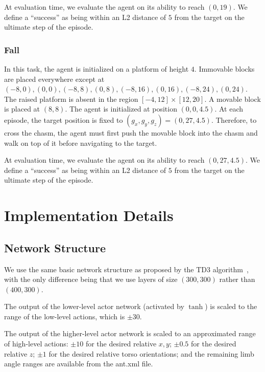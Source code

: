 \documentclass{article}
\begin{document}
At evaluation time, we evaluate the agent on its ability to reach $(0, 19)$.  We define a ``success'' as being within an L2 distance of $5$ from the target on the ultimate step of the episode.

\subsubsection{Fall}
In this task, the agent is initialized on a platform of height $4$.  Immovable blocks are placed everywhere except at $(-8,0), (0,0), (-8,8), (0,8), (-8,16), (0,16), (-8,24), (0,24)$.  
The raised platform is absent in the region $[-4,12]\times[12,20]$.
A movable block is placed at $(8,8)$.
The agent is initialized at position $(0,0,4.5)$.  At each episode, the target position is fixed to $(g_x, g_y, g_z) = (0, 27, 4.5)$.  Therefore, to cross the chasm, the agent must first push the movable block into the chasm and walk on top of it before navigating to the target.

At evaluation time, we evaluate the agent on its ability to reach $(0, 27, 4.5)$.  We define a ``success'' as being within an L2 distance of $5$ from the target on the ultimate step of the episode.


\section{Implementation Details}

\subsection{Network Structure}
We use the same basic network structure as proposed by the TD3 algorithm~\cite{td3}, with the only difference being that we use layers of size $(300, 300)$ rather than $(400, 300)$.

The output of the lower-level actor network (activated by $\tanh$) is scaled to the range of the low-level actions, which is $\pm30$.

The output of the higher-level actor network is scaled to an approximated range of high-level actions: $\pm10$ for the desired relative $x,y$; $\pm0.5$ for the desired relative $z$; $\pm1$ for the desired relative torso orientations; and the remaining limb angle ranges are available from the ant.xml file.
\end{document}
